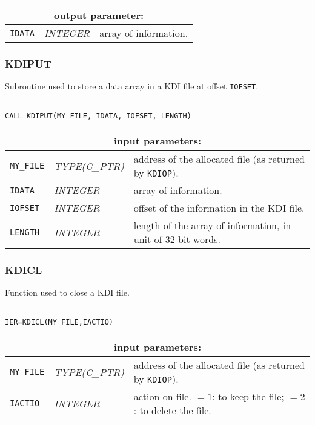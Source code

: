 \vskip 0.4cm
\noindent
\begin{tabular}{|p{1.5cm}|p{3cm}|p{10cm}|}
\hline
\multicolumn{3}{|c|}{\bf output parameter:} \\
\hline
{\tt IDATA} & {\it INTEGER}  & array of information.  \\
\hline
\end{tabular}

\subsubsection{KDIPUT}

Subroutine used to store a data array in a KDI file at offset {\tt IOFSET}.

\begin{verbatim}

CALL KDIPUT(MY_FILE, IDATA, IOFSET, LENGTH)
\end{verbatim}

\noindent
\begin{tabular}{|p{1.5cm}|p{3cm}|p{10cm}|}
\hline
\multicolumn{3}{|c|}{\bf input parameters:} \\
\hline
{\tt MY\_FILE} & {\it TYPE(C\_PTR)} &  address of the allocated file (as returned by {\tt KDIOP}). \\
\hline
{\tt IDATA} & {\it INTEGER}  & array of information.  \\
\hline
{\tt IOFSET} & {\it INTEGER}  & offset of the information in the KDI file. \\
\hline
{\tt LENGTH} & {\it INTEGER}  & length of the array of information, in unit of 32-bit words. \\
\hline
\end{tabular}

\subsubsection{KDICL}

Function used to close a KDI file.

\begin{verbatim}

IER=KDICL(MY_FILE,IACTIO)
\end{verbatim}

\noindent
\begin{tabular}{|p{1.5cm}|p{3cm}|p{10cm}|}
\hline
\multicolumn{3}{|c|}{\bf input parameters:} \\
\hline
{\tt MY\_FILE} & {\it TYPE(C\_PTR)} &  address of the allocated file (as returned by {\tt KDIOP}). \\
\hline
{\tt IACTIO} & {\it INTEGER}  & action on file.
$=1$: to keep the file;
$=2$: to delete the file.  \\
\hline
\end{tabular}

